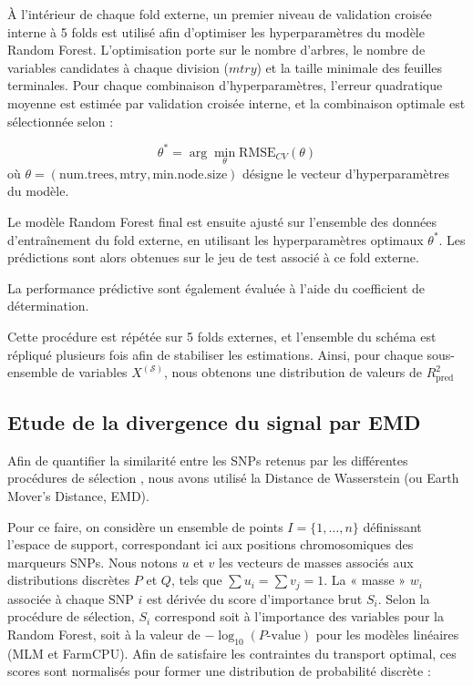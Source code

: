 \documentclass[
  11pt,
  letterpaper,
  DIV=11,
  numbers=noendperiod]{scrartcl}
\begin{document}
À l'intérieur de chaque fold externe, un premier niveau de validation
croisée interne à 5 folds est utilisé afin d'optimiser les
hyperparamètres du modèle Random Forest. L'optimisation porte sur le
nombre d'arbres, le nombre de variables candidates à chaque division
(\(mtry\)) et la taille minimale des feuilles terminales. Pour chaque
combinaison d'hyperparamètres, l'erreur quadratique moyenne est estimée
par validation croisée interne, et la combinaison optimale est
sélectionnée selon :

\[\theta^* = \arg\min_{\theta} \text{RMSE}_{CV}(\theta)\] où
\(\theta = (\text{num.trees}, \text{mtry}, \text{min.node.size})\)
désigne le vecteur d'hyperparamètres du modèle.

Le modèle Random Forest final est ensuite ajusté sur l'ensemble des
données d'entraînement du fold externe, en utilisant les hyperparamètres
optimaux \(\theta^*\). Les prédictions sont alors obtenues sur le jeu de
test associé à ce fold externe.

La performance prédictive sont également évaluée à l'aide du coefficient
de détermination.

Cette procédure est répétée sur 5 folds externes, et l'ensemble du
schéma est répliqué plusieurs fois afin de stabiliser les estimations.
Ainsi, pour chaque sous-ensemble de variables \(X^{(\mathcal{S})}\),
nous obtenons une distribution de valeurs de \(R^2_{\text{pred}}\)

\hypertarget{etude-de-la-divergence-du-signal-par-emd}{%
\subsection{Etude de la divergence du signal par
EMD}\label{etude-de-la-divergence-du-signal-par-emd}}

Afin de quantifier la similarité entre les SNPs retenus par les
différentes procédures de sélection , nous avons utilisé la Distance de
Wasserstein (ou Earth Mover's Distance, EMD).

Pour ce faire, on considère un ensemble de points
\(I = \{1, \dots, n\}\) définissant l'espace de support, correspondant
ici aux positions chromosomiques des marqueurs SNPs. Nous notons \(u\)
et \(v\) les vecteurs de masses associés aux distributions discrètes
\(P\) et \(Q\), tels que \(\sum u_i = \sum v_j = 1\). La « masse »
\(w_i\) associée à chaque SNP \(i\) est dérivée du score d'importance
brut \(S_i\). Selon la procédure de sélection, \(S_i\) correspond soit à
l'importance des variables pour la Random Forest, soit à la valeur de
\(-\log_{10}(P\text{-value})\) pour les modèles linéaires (MLM et
FarmCPU). Afin de satisfaire les contraintes du transport optimal, ces
scores sont normalisés pour former une distribution de probabilité
discrète :
\end{document}
